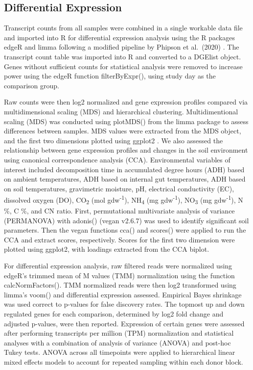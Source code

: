 \documentclass[
  sn-nature,
  lineno, referee]{sn-jnl}
\begin{document}
\subsection{Differential Expression}\label{differential-expression}

Transcript counts from all samples were combined in a single workable
data file and imported into R for differential expression analysis using
the R packages edgeR \citep{robinson_edger_2010} and limma
\citep{smyth_limma_2005} following a modified pipeline by Phipson et
al.~(2020) \citep{phipson_differential_2020}. The transcript count table
was imported into R and converted to a DGElist object. Genes without
sufficient counts for statistical analysis were removed to increase
power using the edgeR function filterByExpr(), using study day as the
comparison group.

Raw counts were then log2 normalized and gene expression profiles
compared via multidimensional scaling (MDS) and hierarchical clustering.
Multidimentional scaling (MDS) was conducted using plotMDS() from the
limma package to assess differences between samples. MDS values were
extracted from the MDS object, and the first two dimensions plotted
using ggplot2 \citep{wickham_ggplot2_2016}. We also assessed the
relationship between gene expression profiles and changes in the soil
environment using canonical correspondence analysis (CCA). Environmental
variables of interest included decomposition time in accumulated degree
hours (ADH) based on ambient temperatures, ADH based on internal gut
temperatures, ADH based on soil temperatures, gravimetric moisture, pH,
electrical conductivity (EC), dissolved oxygen (DO), CO\textsubscript{2}
(\textmu mol gdw\textsuperscript{-1}), NH\textsubscript{4} (mg
gdw\textsuperscript{-1}), NO\textsubscript{3} (mg
gdw\textsuperscript{-1}), N \%, C \%, and CN ratio. First, permutational
multivariate analysis of variance (PERMANOVA) with adonis() (vegan
v2.6.7) \citep{oksanen_vegan_2024} was used to identify significant soil
parameters. Then the vegan functions cca() and scores() were applied to
run the CCA and extract scores, respectively. Scores for the first two
dimension were plotted using ggplot2, with loadings extracted from the
CCA biplot.

For differential expression analysis, raw filtered reads were normalized
using edgeR's trimmed mean of M values (TMM) normalization using the
function calcNormFactors(). TMM normalized reads were then log2
transformed using limma's voom() and differential expression assessed.
Empirical Bayes shrinkage was used correct to p-values for false
discovery rates. The topmost up and down regulated genes for each
comparison, determined by log2 fold change and adjusted p-values, were
then reported. Expression of certain genes were assessed after
performing transcripts per million (TPM) normalization and statistical
analyses with a combination of analysis of variance (ANOVA) and post-hoc
Tukey tests. ANOVA across all timepoints were applied to hierarchical
linear mixed effects models to account for repeated sampling within each
donor block.
\end{document}
